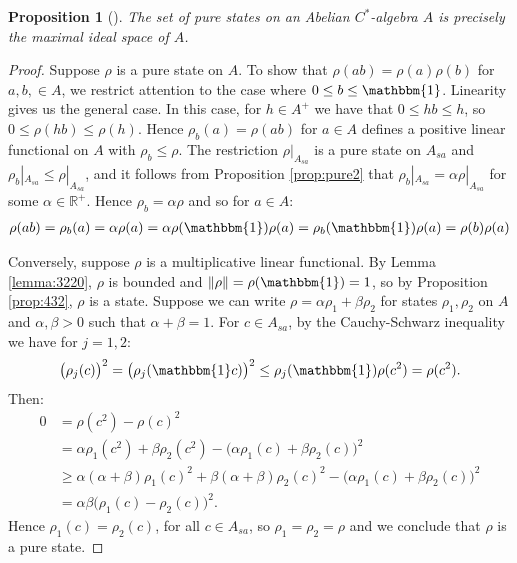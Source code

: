 \documentclass[11pt,a4paper]{report}
\theoremstyle{plain}
\newtheorem{prop}{Proposition}
\theoremstyle{definition}
\newcommand{\1}{\mathbbm{1}}
\newcommand{\R}{\mathbb{R}}
\begin{document}
\begin{prop}[{\cite[4.4.1]{kadison83}}]\label{prop:puremult}
	The set of pure states on an Abelian $C^\ast$-algebra $A$ is precisely the 
	maximal ideal space of $A$.
\end{prop}
\begin{proof}
	Suppose $\rho$ is a pure state on $A$. To show that $\rho(ab)=\rho(a)\rho(b)$ 
	for $a,b,\in A$, we restrict attention to the case where $0\leq b\leq\1$. 
	Linearity gives us the general case. In this case, for $h\in A^+$ we have that 
	$0\leq hb\leq h$, so $0\leq\rho(hb)\leq\rho(h)$. Hence $\rho_b(a)=\rho(ab)$ for 
	$a\in A$ defines a positive linear functional on $A$ with $\rho_b\leq\rho$. The 
	restriction $\rho|_{A_{sa}}$ is a pure state on $A_{sa}$ and $\rho_b|_{A_{sa}} 
	\leq \rho|_{A_{sa}}$, and it follows from Proposition \ref{prop:pure2} that 
	$\rho_b|_{A_{sa}} = \alpha \rho|_{A_{sa}}$ for some $\alpha \in \R^+$.
	Hence $\rho_b = \alpha\rho$  and so for $a\in A$:
	\begin{align*}
		\rho(ab) = \rho_b(a) = \alpha\rho(a) = 
							\alpha\rho(\1)\rho(a) = \rho_b(\1)\rho(a) = \rho(b)\rho(a)
	\end{align*}
	
	Conversely, suppose $\rho$ is a multiplicative linear functional. By Lemma 
	\ref{lemma:3220}, $\rho$ is bounded and $\left\|\rho\right\|=\rho(\1)=1$, so by 
	Proposition \ref{prop:432}, $\rho$ is a state. Suppose we can write 
	$\rho=\alpha\rho_1+\beta\rho_2$ for states $\rho_1,\rho_2$ on $A$ and 
	$\alpha,\beta >0$ such that $\alpha+\beta=1$. For $c\in A_{sa}$, by the 
	Cauchy-Schwarz inequality we have for $j=1,2$:
	\begin{align*}
		\big(\rho_j(c)\big)^2 = \big(\rho_j(\1 c)\big)^2 
					\leq \rho_j(\1)\rho(c^2)=\rho(c^2).
	\end{align*}
	Then:
	\begin{align*}
				0
		&=		\rho(c^2)-\rho(c)^2 														\\
		&=		\alpha\rho_1(c^2)+\beta\rho_2(c^2) 
						- \big(\alpha\rho_1(c)+\beta\rho_2(c)\big)^2						\\
		&\geq	\alpha(\alpha+\beta)\rho_1(c)^2 
						+ \beta(\alpha+\beta)\rho_2(c)^2
						- \big(\alpha\rho_1(c)+\beta\rho_2(c)\big)^2						\\
		&=		\alpha\beta\big(\rho_1(c) - \rho_2(c)\big)^2.
	\end{align*}
	Hence $\rho_1(c)=\rho_2(c)$, for all $c\in A_{sa}$, so $\rho_1=\rho_2 =\rho$ and 
	we conclude that $\rho$ is a pure state.
\end{proof}
\end{document}

